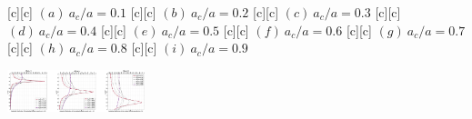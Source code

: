 [c][c] {$(a) \ a_{c}/a=0.1$}
[c][c] {$(b) \ a_{c}/a=0.2$}
[c][c] {$(c) \ a_{c}/a=0.3$}
[c][c] {$(d) \ a_{c}/a=0.4$}
[c][c] {$(e) \ a_{c}/a=0.5$}
[c][c] {$(f) \ a_{c}/a=0.6$}
[c][c] {$(g) \ a_{c}/a=0.7$}
[c][c] {$(h) \ a_{c}/a=0.8$}
[c][c] {$(i) \ a_{c}/a=0.9$}

\includegraphics[width=0.3\textwidth]{maxshear_9figs_456.eps}
